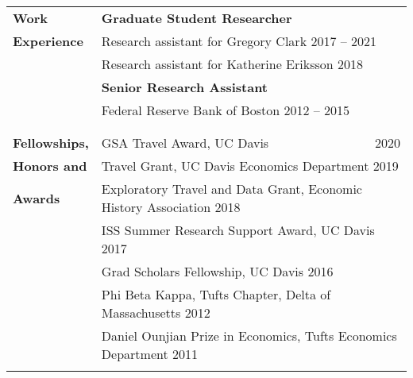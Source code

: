 \documentclass[a4paper,11pt,oneside]{article}
\begin{document}
\begin{longtable}{@{} p{0.175\linewidth} p{0.775\linewidth} p{0.05\linewidth}}
     \\


  \textbf{\large{Work }}    &  \multicolumn{2}{l}{ \textbf{Graduate Student Researcher}}\\
  \textbf{\large{Experience}}     &  \multicolumn{2}{l}{ Research assistant for Gregory Clark \hfill 2017 -- 2021 }\\

     &  \multicolumn{2}{l}{ Research assistant for Katherine Eriksson \hfill 2018}\\
    &  \multicolumn{2}{l}{ \textbf{Senior Research Assistant } }\\
    &  \multicolumn{2}{l}{ Federal Reserve Bank of Boston \hfill   2012 -- 2015}\\
     \\
     \\

 \textbf{\large{Fellowships,}}   &  GSA Travel Award, UC Davis & \hfill  2020\\
  \textbf{\large{Honors and }}   &  \multicolumn{2}{l}{ Travel Grant, UC Davis Economics Department \hfill 2019}\\  
  \textbf{\large{Awards}}  &  \multicolumn{2}{l}{ Exploratory Travel and Data Grant, Economic History Association \hfill 2018}\\
  &  \multicolumn{2}{l}{ ISS Summer Research Support Award, UC Davis \hfill 2017}\\
  &  \multicolumn{2}{l}{ Grad Scholars Fellowship, UC Davis \hfill  2016}\\
  &  \multicolumn{2}{l}{ Phi Beta Kappa, Tufts Chapter, Delta of Massachusetts \hfill 2012}\\
  &   \multicolumn{2}{l}{ Daniel Ounjian Prize in Economics, Tufts Economics Department \hfill 2011}\\
  \\


      


\end{longtable}
\end{document}

